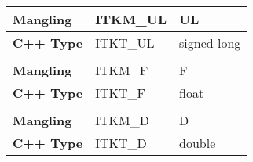 \begin{table}
\begin{center}
\begin{tabular}{l | l | l |}
\\ \hline
\textbf{Mangling} & ITKM\_UL & UL \\ \hline
\textbf{C++ Type} & ITKT\_UL & signed long \\ \hline
\\ \hline
\textbf{Mangling} & ITKM\_F & F \\ \hline
\textbf{C++ Type} & ITKT\_F & float \\ \hline
\\ \hline
\textbf{Mangling} & ITKM\_D & D \\ \hline
\textbf{C++ Type} & ITKT\_D & double \\ \hline
\end{tabular}
\end{center}
\label{tab:WrappingManglingForPODs}
\end{table}


